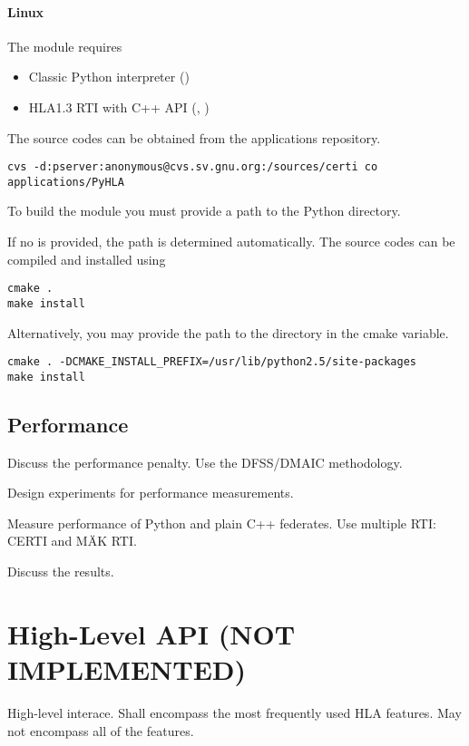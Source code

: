 \documentclass[12pt,a4paper]{howto}
\begin{document}
\paragraph{Linux}

The  module requires
\begin{itemize}
\item Classic Python interpreter ()
\item HLA1.3 RTI with C++ API (, )
\end{itemize}

The  source codes can be obtained from the 
applications repository.
\begin{verbatim}
cvs -d:pserver:anonymous@cvs.sv.gnu.org:/sources/certi co applications/PyHLA
\end{verbatim}

To build the  module you must provide a path to the Python
 directory.

If no  is provided, the path is determined
automatically. The source codes can be compiled and installed using
\begin{verbatim}
cmake .
make install
\end{verbatim}

Alternatively, you may provide the path to the  directory
in the  cmake variable.
\begin{verbatim}
cmake . -DCMAKE_INSTALL_PREFIX=/usr/lib/python2.5/site-packages
make install
\end{verbatim}

\subsection{Performance}

Discuss the performance penalty. Use the DFSS/DMAIC methodology.

Design experiments for performance measurements.

Measure performance of Python and plain C++ federates. Use multiple RTI: CERTI and MÄK RTI.

Discuss the results.




\section{High-Level API (NOT IMPLEMENTED)}
High-level interace. Shall encompass the most frequently used HLA features. May not encompass all of the features.
\end{document}
